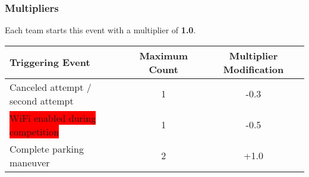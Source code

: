 \subsubsection{Multipliers}
\label{freedrive_multipliers}

Each team starts this event with a multiplier of \textbf{1.0}.

\begin{table}[H]
	\begin{tabular}{@{}lcc@{}}
		\toprule
		\textbf{Triggering Event}                       & \textbf{Maximum Count} & \textbf{Multiplier Modification} \\ \midrule
		Canceled attempt / second attempt               & 1                      & -0.3                             \\
		\colorbox{red}{WiFi enabled during competition} & 1                      & -0.5                             \\
		Complete parking maneuver                       & 2                      & +1.0                             \\
		\bottomrule
	\end{tabular}
\end{table}
